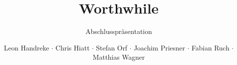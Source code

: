 \documentclass[t,svgnames]{beamer}
\title{Worthwhile}
\subtitle{Abschlusspräsentation}
\author{Leon Handreke $\cdot$ Chris Hiatt $\cdot$ Stefan Orf $\cdot$ Joachim Priesner $\cdot$ Fabian Ruch $\cdot$ Matthias Wagner}
\institute[ITI]{Institut für Theoretische Informatik}
\begin{document}
\begin{frame}
\maketitle
\end{frame}

%	
%	
%		
%	
%	
\end{document}
